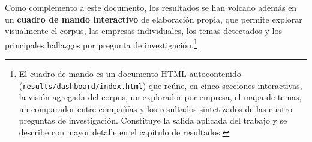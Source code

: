 Como complemento a este documento, los resultados se han volcado además en un
\textbf{cuadro de mando interactivo} de elaboración propia, que permite explorar visualmente
el corpus, las empresas individuales, los temas detectados y los principales hallazgos por
pregunta de investigación.\footnote{El cuadro de mando es un documento HTML autocontenido
(\texttt{results/dashboard/index.html}) que reúne, en cinco secciones interactivas, la visión
agregada del corpus, un explorador por empresa, el mapa de temas, un comparador entre
compañías y los resultados sintetizados de las cuatro preguntas de investigación. Constituye
la salida aplicada del trabajo y se describe con mayor detalle en el capítulo de resultados.}
